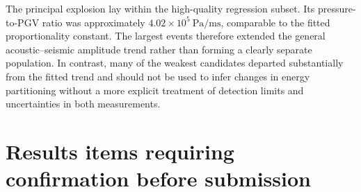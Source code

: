 \documentclass[12pt]{article}
\begin{document}
The principal explosion lay within the high-quality regression subset. Its
pressure-to-PGV ratio was approximately
$4.02\times10^{5}\ \si{\pascal\per\metre\second}$, comparable to the fitted
proportionality constant. The largest events therefore extended the general
acoustic--seismic amplitude trend rather than forming a clearly separate
population. In contrast, many of the weakest candidates departed substantially
from the fitted trend and should not be used to infer changes in energy
partitioning without a more explicit treatment of detection limits and
uncertainties in both measurements.

\clearpage
\section*{Results items requiring confirmation before submission}
\end{document}
